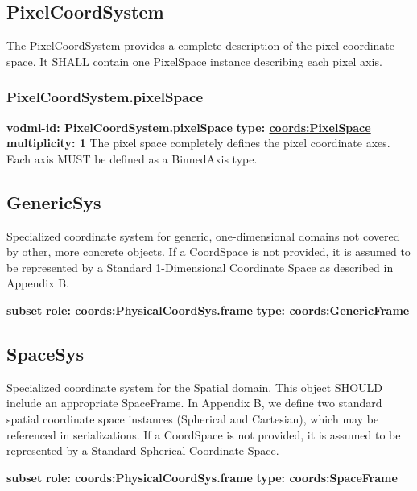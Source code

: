   \subsection{PixelCoordSystem}
  \label{sect:PixelCoordSystem}
    The PixelCoordSystem provides a complete description of the pixel coordinate space. It SHALL contain one PixelSpace instance describing each pixel axis.

    \subsubsection{PixelCoordSystem.pixelSpace}
      \textbf{vodml-id: PixelCoordSystem.pixelSpace} \newline
      \textbf{type: \hyperref[sect:PixelSpace]{coords:PixelSpace}} \newline
      \textbf{multiplicity: 1} \newline 
      The pixel space completely defines the pixel coordinate axes.  Each axis MUST be defined as a BinnedAxis type.

  \subsection{GenericSys}
  \label{sect:GenericSys}
    Specialized coordinate system for generic, one-dimensional domains not covered by other, more concrete objects. If a CoordSpace is not provided, it is assumed to be represented by a Standard 1-Dimensional Coordinate Space as described in Appendix B.

    \noindent \textbf{subset} \newline
    \indent   \textbf{role: coords:PhysicalCoordSys.frame} \newline
    \indent   \textbf{type: coords:GenericFrame} \newline


  \subsection{SpaceSys}
  \label{sect:SpaceSys}
    Specialized coordinate system for the Spatial domain. This object SHOULD include an appropriate SpaceFrame. In Appendix B, we define two standard spatial coordinate space instances (Spherical and Cartesian), which may be referenced in serializations. If a CoordSpace is not provided, it is assumed to be represented by a Standard Spherical Coordinate Space.

    \noindent \textbf{subset} \newline
    \indent   \textbf{role: coords:PhysicalCoordSys.frame} \newline
    \indent   \textbf{type: coords:SpaceFrame} \newline


